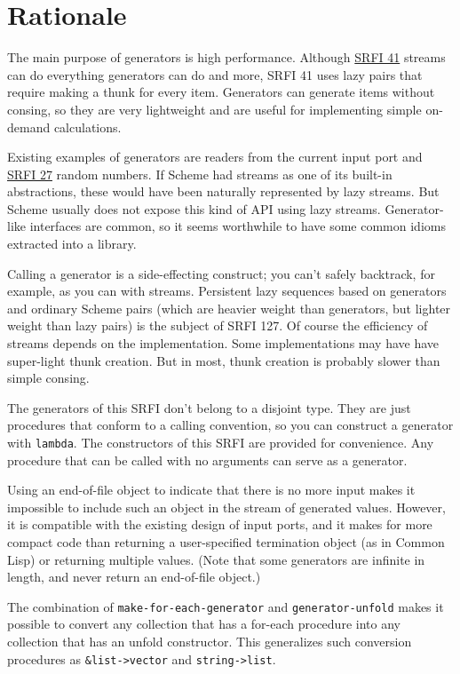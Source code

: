 \section{Rationale}\label{rationale}

The main purpose of generators is high performance. Although
\href{http://srfi.schemers.org/srfi-41/srfi-41.html}{SRFI 41} streams
can do everything generators can do and more, SRFI 41 uses lazy pairs
that require making a thunk for every item. Generators can generate
items without consing, so they are very lightweight and are useful for
implementing simple on-demand calculations.

Existing examples of generators are readers from the current input port
and \href{http://srfi.schemers.org/srfi-27/srfi-27.html}{SRFI 27} random
numbers. If Scheme had streams as one of its built-in abstractions,
these would have been naturally represented by lazy streams. But Scheme
usually does not expose this kind of API using lazy streams.
Generator-like interfaces are common, so it seems worthwhile to have
some common idioms extracted into a library.

Calling a generator is a side-effecting construct; you can't safely
backtrack, for example, as you can with streams. Persistent lazy
sequences based on generators and ordinary Scheme pairs (which are
heavier weight than generators, but lighter weight than lazy pairs) is
the subject of SRFI 127. Of course the efficiency of streams depends on
the implementation. Some implementations may have have super-light thunk
creation. But in most, thunk creation is probably slower than simple
consing.

The generators of this SRFI don't belong to a disjoint type. They are
just procedures that conform to a calling convention, so you can
construct a generator with \texttt{lambda}. The constructors of this
SRFI are provided for convenience. Any procedure that can be called with
no arguments can serve as a generator.

Using an end-of-file object to indicate that there is no more input
makes it impossible to include such an object in the stream of generated
values. However, it is compatible with the existing design of input
ports, and it makes for more compact code than returning a
user-specified termination object (as in Common Lisp) or returning
multiple values. (Note that some generators are infinite in length, and
never return an end-of-file object.)

The combination of \texttt{make-for-each-generator} and
\texttt{generator-unfold} makes it possible to convert any collection
that has a for-each procedure into any collection that has an unfold
constructor. This generalizes such conversion procedures as
\texttt{\&list-\textgreater{}vector} and
\texttt{string-\textgreater{}list}.
